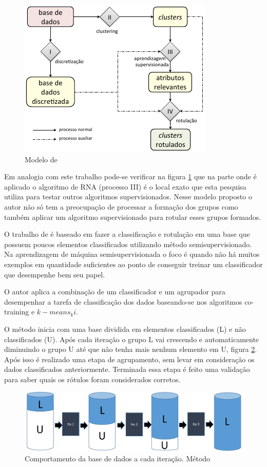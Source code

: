 \begin{figure}[h]
        \centering
        \includegraphics[scale=0.8]{figs/modeloLopes.png}
        \caption{Modelo de } 
        \label{fig:modeloLOPES}
\end{figure}

Em analogia com este trabalho pode-se verificar na figura \ref{fig:modeloLOPES} que na parte onde é aplicado o algoritmo  de RNA (processo III) é o local exato que esta pesquisa utiliza para testar outros algoritmos supervisionados. Nesse modelo proposto o autor não só tem a preocupação de processar  a formação dos grupos como também aplicar um algoritmo supervisionado para rotular esses grupos formados.




O trabalho de  é baseado em fazer a classificação e rotulação em uma base que possuem poucos elementos classificados utilizando método semisupervisionado. Na aprendizagem de máquina semisupervisionada o foco é quando não há muitos exemplos em quantidade suficientes ao ponto de conseguir treinar um classificador que desempenhe bem seu papel. 

O autor aplica a combinação de um classificador e um agrupador para desempenhar  a tarefa de classificação dos dados baseando-se nos algoritmos co-training e $k-means_ki$.


O método inicia com uma base dividida em elementos classificados (L) e não classificados (U). Após cada iteração o grupo L vai crescendo e automaticamente diminuindo o grupo U até que não tenha mais nenhum elemento em U, figura  \ref{fig:modeloVicente}. Após isso é realizado uma etapa de agrupamento, sem levar em consideração os dados classificados anteriormente. Terminada essa etapa é feito uma validação para saber quais os rótulos foram considerados corretos.
\begin{figure}[!h]
        \centering
        \includegraphics[scale=0.4]{figs/modeloVicente.png}
        \caption{Comportamento da base de dados a cada iteração. Método \cite{Metodo2015}} \label{fig:modeloVicente}
\end{figure}

